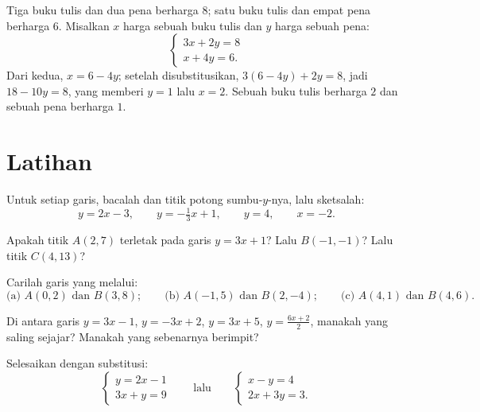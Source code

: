 \begin{example}\label{ex:g10:lines:modeling}
Tiga buku tulis dan dua pena berharga $8$; satu buku tulis dan empat pena
berharga $6$. Misalkan $x$ harga sebuah buku tulis dan $y$ harga sebuah pena:
\[
\begin{cases}
3x + 2y = 8 \\
x + 4y = 6 .
\end{cases}
\]
Dari  kedua, $x = 6 - 4y$; setelah disubstitusikan,
$3(6 - 4y) + 2y = 8$, jadi $18 - 10y = 8$, yang memberi $y = 1$ lalu
$x = 2$. Sebuah buku tulis berharga $2$ dan sebuah pena berharga $1$.
\end{example}

\section{Latihan}

\begin{exercise}[$\star$]\label{exo:g10:lines:1}
Untuk setiap garis, bacalah  dan titik potong sumbu-$y$-nya, lalu sketsalah:
\[
y = 2x - 3, \qquad
y = -\tfrac13 x + 1, \qquad
y = 4, \qquad
x = -2 .
\]
\end{exercise}

\begin{exercise}[$\star$]\label{exo:g10:lines:2}
Apakah titik $A(2, 7)$ terletak pada garis $y = 3x + 1$? Lalu $B(-1, -1)$?
Lalu titik $C(4, 13)$?
\end{exercise}

\begin{exercise}[$\star$]\label{exo:g10:lines:3}
Carilah  garis yang melalui:
\[
\text{(a) } A(0, 2) \text{ dan } B(3, 8);
\qquad
\text{(b) } A(-1, 5) \text{ dan } B(2, -4);
\qquad
\text{(c) } A(4, 1) \text{ dan } B(4, 6).
\]
\end{exercise}

\begin{exercise}[$\star$]\label{exo:g10:lines:4}
Di antara garis $y = 3x - 1$, $y = -3x + 2$, $y = 3x + 5$,
$y = \frac{6x + 2}{2}$, manakah yang saling sejajar? Manakah yang
sebenarnya berimpit?
\end{exercise}

\begin{exercise}[$\star$]\label{exo:g10:lines:5}
Selesaikan dengan substitusi:
\[
\begin{cases}
y = 2x - 1 \\
3x + y = 9
\end{cases}
\qquad\text{lalu}\qquad
\begin{cases}
x - y = 4 \\
2x + 3y = 3 .
\end{cases}
\]
\end{exercise}

